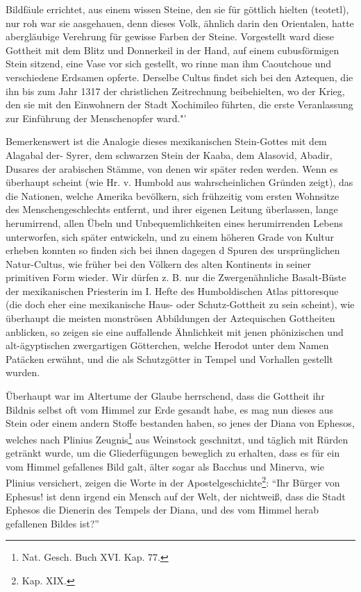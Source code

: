 \documentclass[a4paper, 11pt, oneside, polutonikogreek, german]{article}
\begin{document}
Bildfäule errichtet, aus einem wissen Steine, den sie für göttlich hielten (teotetl), nur roh war sie aasgehauen, denn dieses Volk, ähnlich darin den Orientalen, hatte abergläubige Verehrung für gewisse Farben der Steine. Vorgestellt ward diese Gottheit mit dem Blitz und Donnerkeil in der Hand, auf einem cubusförmigen Stein sitzend, eine Vase vor sich gestellt, wo rinne man ihm Caoutchoue und verschiedene Erdsamen opferte. Derselbe Cultus findet sich bei den Aztequen, die ihn bis zum Jahr 1317 der christlichen Zeitrechnung beibehielten, wo der Krieg, den sie mit den Einwohnern der Stadt Xochimileo führten, die erste Veranlassung zur Einführung der Menschenopfer ward."'

Bemerkenswert ist die Analogie dieses mexikanischen Stein-Gottes mit dem Alagabal der- Syrer, dem schwarzen Stein der Kaaba, dem Alasovid, Abadir, Dusares der arabischen Stämme, von denen wir später reden werden. Wenn es überhaupt scheint (wie Hr. v. Humbold aus wahrscheinlichen Gründen zeigt), das die Nationen, welche Amerika bevölkern, sich frühzeitig vom ersten Wohnsitze des Menschengeschlechts entfernt, und ihrer eigenen Leitung überlassen, lange herumirrend, allen Übeln und Unbequemlichkeiten eines herumirrenden Lebens unterworfen, sich später entwickeln, und zu einem höheren Grade von Kultur erheben konnten so finden sich bei ihnen dagegen d Spuren des ursprünglichen Natur-Cultus, wie früher bei den Völkern des alten Kontinents in seiner primitiven Form wieder. Wir dürfen z. B. nur die Zwergenähnliche Basalt-Büste der mexikanischen Priesterin im I. Hefte des Humboldischen Atlas pittoresque (die doch eher eine mexikanische Haus- oder Schutz-Gottheit zu sein scheint), wie überhaupt die meisten monströsen Abbildungen der Aztequischen Gottheiten anblicken, so zeigen sie eine auffallende Ähnlichkeit mit jenen phönizischen und alt-ägyptischen zwergartigen Götterchen, welche Herodot unter dem Namen Patäcken erwähnt, und die als Schutzgötter in Tempel und Vorhallen gestellt wurden.

Überhaupt war im Altertume der Glaube herrschend, dass die Gottheit ihr Bildnis selbst oft vom Himmel zur Erde gesandt habe, es mag nun dieses aus Stein oder einem andern Stoffe bestanden haben, so jenes der Diana von Ephesos, welches nach Plinius Zeugnis\footnote{Nat. Gesch. Buch XVI. Kap. 77.} aus Weinstock geschnitzt, und täglich mit Rürden getränkt wurde, um die Gliederfügungen beweglich zu erhalten, dass es für ein vom Himmel gefallenes Bild galt, älter sogar als Bacchus und Minerva, wie Plinius versichert, zeigen die Worte in der Apostelgeschichte\footnote{Kap. XIX.}: "`Ihr Bürger von Ephesus! ist denn irgend ein Mensch auf der Welt, der nichtweiß, dass die Stadt Ephesos die Dienerin des Tempels der Diana, und des vom Himmel herab gefallenen Bildes ist?"'
\end{document}
